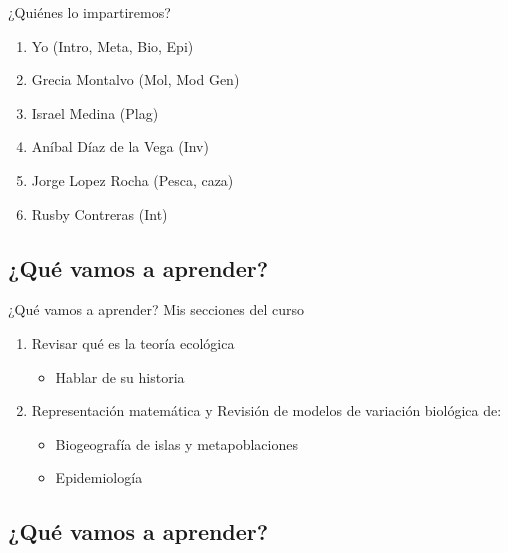 \documentclass[
  11pt,
  ignorenonframetext,
]{beamer}
\providecommand{\tightlist}{%
  \setlength{\itemsep}{0pt}\setlength{\parskip}{0pt}}
\begin{document}
\begin{frame}{¿Quiénes lo impartiremos?}
\begin{enumerate}
\item
  Yo (Intro, Meta, Bio, Epi)
\item
  Grecia Montalvo (Mol, Mod Gen)
\item
  Israel Medina (Plag)
\item
  Aníbal Díaz de la Vega (Inv)
\item
  Jorge Lopez Rocha (Pesca, caza)
\item
  Rusby Contreras (Int)
\end{enumerate}
\end{frame}

\subsection{¿Qué vamos a aprender?}\label{quuxe9-vamos-a-aprender}

\begin{frame}{¿Qué vamos a aprender?}
Mis secciones del curso

\begin{enumerate}
\item
  Revisar qué es la teoría ecológica

  \begin{itemize}
  \tightlist
  \item
    Hablar de su historia
  \end{itemize}
\item
  Representación matemática y Revisión de modelos de variación biológica
  de:

  \begin{itemize}
  \item
    Biogeografía de islas y metapoblaciones
  \item
    Epidemiología
  \end{itemize}
\end{enumerate}
\end{frame}

\subsection{¿Qué vamos a aprender?}\label{quuxe9-vamos-a-aprender-1}
\end{document}
